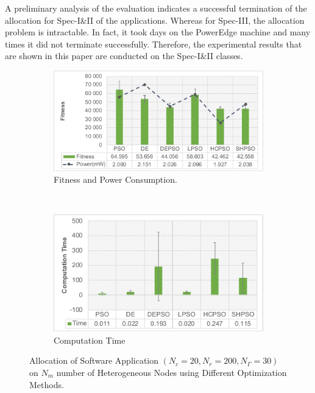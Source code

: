 A preliminary analysis of the evaluation indicates a successful termination of the allocation for Spec-I\&II of the applications. Whereas for Spec-III, the allocation problem is intractable. In fact, it took days on the PowerEdge machine and many times it did not terminate successfully. Therefore, the experimental results that are shown in this paper are conducted on the Spec-I\&II classes. 
\begin{figure}
    \centering
    \begin{subfigure}[b]{0.525  \textwidth}
        \includegraphics[width=\textwidth]{img/fitness_c20_g30_m10.pdf}
        \caption{Fitness and Power Consumption.}
        \label{fig_util}
    \end{subfigure}
    ~%
        \begin{subfigure}[b]{0.45\textwidth}
        \includegraphics[width=\textwidth]{img/time_c20_g30_m10.pdf}
        \caption{Computation Time}
        \label{fig_power}
    \end{subfigure}
    \caption{Allocation of Software Application $(N_c=20,N_r=200,N_\Gamma=30)$ on $N_m$ number of Heterogeneous Nodes using Different Optimization Methods.}
    \label{fig_util_power}\vspace{-0.2cm}
\end{figure}



